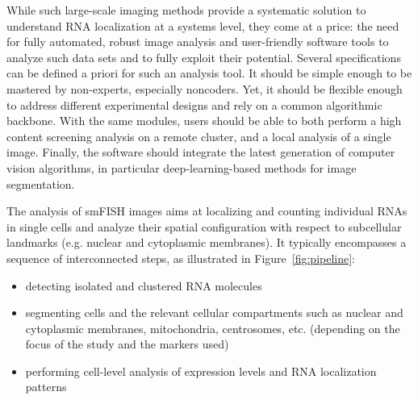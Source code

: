 While such large-scale imaging methods provide a systematic solution to understand \ac{RNA} localization at a systems level, they come at a price: the need for fully automated, robust image analysis and user-friendly software tools to analyze such data sets and to fully exploit their potential.
Several specifications can be defined a priori for such an analysis tool.
It should be simple enough to be mastered by non-experts, especially noncoders.
Yet, it should be flexible enough to address different experimental designs and rely on a common algorithmic backbone.
With the same modules, users should be able to both perform a high content screening analysis on a remote cluster, and a local analysis of a single image.
Finally, the software should integrate the latest generation of computer vision algorithms, in particular deep-learning-based methods for image segmentation.

The analysis of \ac{smFISH} images aims at localizing and counting individual \ac{RNA}s in single cells and analyze their spatial configuration with respect to subcellular landmarks (e.g. nuclear and cytoplasmic membranes). 
It typically encompasses a sequence of interconnected steps, as illustrated in Figure~\ref{fig:pipeline}:
\begin{itemize}
	\setlength\itemsep{0.1em}
	\item detecting isolated and clustered \ac{RNA} molecules
	\item segmenting cells and the relevant cellular compartments such as nuclear and cytoplasmic membranes, mitochondria, centrosomes, etc. (depending on the focus of the study and the markers used)
	\item performing cell-level analysis of expression levels and \ac{RNA} localization patterns
\end{itemize}


